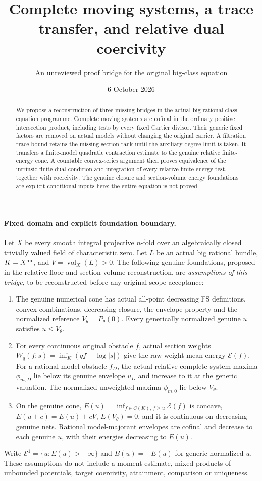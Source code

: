 \documentclass[10pt]{article}
\title{Complete moving systems, a trace transfer, and relative dual coercivity}
\author{An unreviewed proof bridge for the original big-class equation}
\date{6 October 2026}
\newcommand{\vol}{\operatorname{vol}}
\begin{document}
\maketitle
\begin{abstract}
We propose a reconstruction of three missing bridges in the actual big
rational-class equation programme. Complete moving systems are cofinal
in the ordinary positive intersection product, including tests by every
fixed Cartier divisor. Their generic fixed factors are removed on actual
models without changing the original carrier. A filtration trace bound
retains the missing section rank until the auxiliary degree limit is
taken. It transfers a finite-model quadratic contraction estimate to
the genuine relative finite-energy cone. A countable convex-series
argument then proves equivalence of the intrinsic finite-dual condition
and integration of every relative finite-energy test, together with
coercivity. The genuine closure and section-volume energy foundations
are explicit conditional inputs here; the entire equation is not proved.
\end{abstract}

\paragraph{Fixed domain and explicit foundation boundary.}
Let $X$ be every smooth integral projective $n$-fold over an algebraically
closed trivially valued field of characteristic zero. Let $L$ be an actual
big rational bundle, $K=X^{\rm an}$, and $V=\vol_X(L)>0$.
The following genuine foundations, proposed in the relative-floor and
section-volume reconstruction, are \emph{assumptions of this bridge},
to be reconstructed before any original-scope acceptance:

\begin{enumerate}
\item The genuine numerical cone has actual all-point decreasing FS
definitions, convex combinations, decreasing closure, the envelope
property and the normalized reference $V_\theta=P_\theta(0)$.
Every generically normalized genuine $u$ satisfies $u\leq V_\theta$.
\item For every continuous original obstacle $f$, actual section weights
$W_q(f;s)=\inf_K(qf-\log|s|)$ give the raw weight-mean energy
$\mathscr E(f)$. For a rational model obstacle $f_D$, the actual
relative complete-system maxima $\phi_{m,D}$ lie below its genuine
envelope $u_D$ and increase to it at the generic valuation.
The normalized unweighted maxima $\phi_{m,0}$ lie below $V_\theta$.
\item On the genuine cone,
$E(u)=\inf_{f\in C(K),\,f\geq u}\mathscr E(f)$ is concave,
$E(u+c)=E(u)+cV$, $E(V_\theta)=0$, and it is continuous on
decreasing genuine nets. Rational model-majorant envelopes are cofinal
and decrease to each genuine $u$, with their energies decreasing to $E(u)$.
\end{enumerate}
Write $\mathcal E^1=\{u:E(u)>-\infty\}$ and $B(u)=-E(u)$ for
generic-normalized $u$. These assumptions do not include a moment
estimate, mixed products of unbounded potentials, target coercivity,
attainment, comparison or uniqueness.
\end{document}
